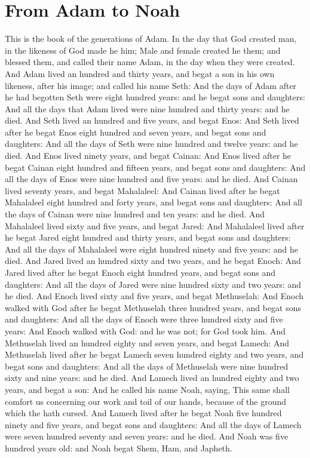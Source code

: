 \section*{From Adam to Noah}
\begin{biblechapter} %
\verse This is the book of the generations of Adam. In the day that God created man, in the likeness of God made he him;
\verse Male and female created he them; and blessed them, and called their name Adam, in the day when they were created.
\verse And Adam lived an hundred and thirty years, and begat a son in his own likeness, after his image; and called his name Seth:
\verse And the days of Adam after he had begotten Seth were eight hundred years: and he begat sons and daughters:
\verse And all the days that Adam lived were nine hundred and thirty years: and he died.
\verse And Seth lived an hundred and five years, and begat Enos:
\verse And Seth lived after he begat Enos eight hundred and seven years, and begat sons and daughters:
\verse And all the days of Seth were nine hundred and twelve years: and he died.
\verse And Enos lived ninety years, and begat Cainan:
\verse And Enos lived after he begat Cainan eight hundred and fifteen years, and begat sons and daughters:
\verse And all the days of Enos were nine hundred and five years: and he died.
\verse And Cainan lived seventy years, and begat Mahalaleel:
\verse And Cainan lived after he begat Mahalaleel eight hundred and forty years, and begat sons and daughters:
\verse And all the days of Cainan were nine hundred and ten years: and he died.
\verse And Mahalaleel lived sixty and five years, and begat Jared:
\verse And Mahalaleel lived after he begat Jared eight hundred and thirty years, and begat sons and daughters:
\verse And all the days of Mahalaleel were eight hundred ninety and five years: and he died.
\verse And Jared lived an hundred sixty and two years, and he begat Enoch:
\verse And Jared lived after he begat Enoch eight hundred years, and begat sons and daughters:
\verse And all the days of Jared were nine hundred sixty and two years: and he died.
\verse And Enoch lived sixty and five years, and begat Methuselah:
\verse And Enoch walked with God after he begat Methuselah three hundred years, and begat sons and daughters:
\verse And all the days of Enoch were three hundred sixty and five years:
\verse And Enoch walked with God: and he was not; for God took him.
\verse And Methuselah lived an hundred eighty and seven years, and begat Lamech:
\verse And Methuselah lived after he begat Lamech seven hundred eighty and two years, and begat sons and daughters:
\verse And all the days of Methuselah were nine hundred sixty and nine years: and he died.
\verse And Lamech lived an hundred eighty and two years, and begat a son:
\verse And he called his name Noah, saying, This same shall comfort us concerning our work and toil of our hands, because of the ground which the \LORD hath cursed.
\verse And Lamech lived after he begat Noah five hundred ninety and five years, and begat sons and daughters:
\verse And all the days of Lamech were seven hundred seventy and seven years: and he died.
\verse And Noah was five hundred years old: and Noah begat Shem, Ham, and Japheth.
\end{biblechapter}

